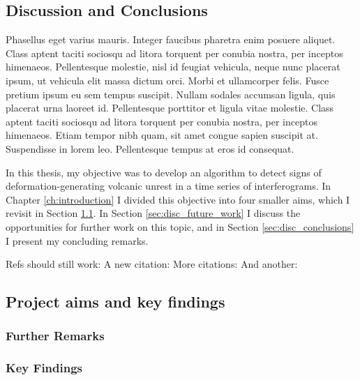 

\onehalfspacing
\begin{refsection}
\chapter[Discussion and Conclusions]{Discussion and Conclusions}
\label{ch:back_material}

Phasellus eget varius mauris. Integer faucibus pharetra enim posuere aliquet. Class aptent taciti sociosqu ad litora torquent per conubia nostra, per inceptos himenaeos. Pellentesque molestie, nisl id feugiat vehicula, neque nunc placerat ipsum, ut vehicula elit massa dictum orci. Morbi et ullamcorper felis. Fusce pretium ipsum eu sem tempus suscipit. Nullam sodales accumsan ligula, quis placerat urna laoreet id. Pellentesque porttitor et ligula vitae molestie. Class aptent taciti sociosqu ad litora torquent per conubia nostra, per inceptos himenaeos. Etiam tempor nibh quam, sit amet congue sapien suscipit at. Suspendisse in lorem leo. Pellentesque tempus at eros id consequat.

In this thesis, my objective was to develop an algorithm to detect signs of deformation-generating volcanic unrest in a time series of interferograms.  In Chapter \ref{ch:introduction} I divided this objective into four smaller aims, which I revisit in Section \ref{sec:disc_project_aims}.  In Section \ref{sec:disc_future_work} I discuss the opportunities for further work on this topic, and in Section \ref{sec:disc_conclusions} I present my concluding remarks.

Refs should still work:
A new citation: \citep{Bernard1997}
More citations: \citep{Hyvarinen1997}
And another: \citep{Mogi1958}



\section{Project aims and key findings}
\label{sec:disc_project_aims}


	\subsection{Further Remarks}
	\label{subsec:further_remarks}


	\subsection{Key Findings}
	\label{subsec:disc_key_findings}


\end{refsection}
